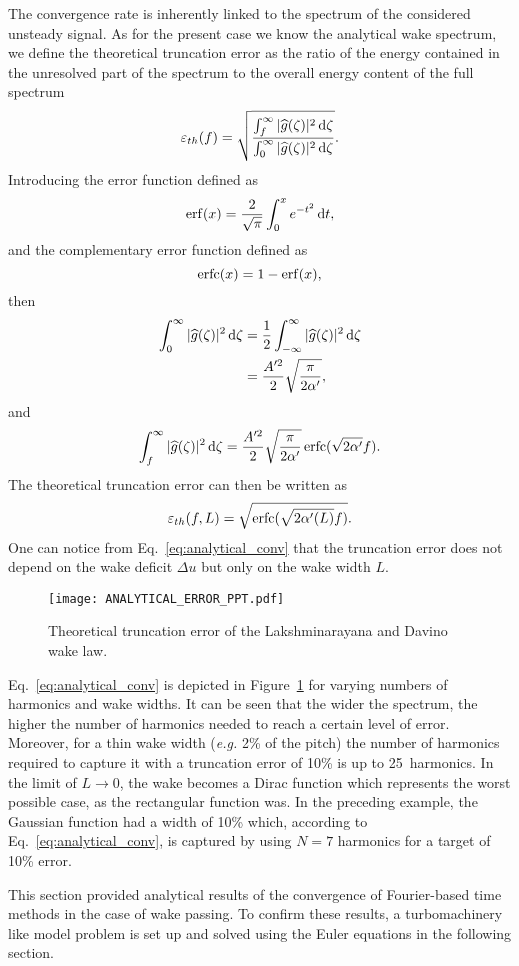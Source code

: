 The convergence rate is inherently linked to
the spectrum of the considered unsteady signal.
As for the present case we know the analytical wake spectrum,
we define the theoretical truncation error as the ratio of
the energy contained in the unresolved part 
of the spectrum to the overall energy content of the full spectrum
\begin{equation}
    \varepsilon_{th}(f) = \sqrt{\frac{
        \int_f^\infty | \widehat{g}(\zeta)|^2 \diff \zeta
      }{
        \int_0^\infty | \widehat{g}(\zeta)|^2 \diff \zeta
      }}.
    \label{eq:def_truncation_error}
\end{equation}
Introducing the error function defined as
\begin{equation}
    \operatorname{erf}(x) = \frac{2}{\sqrt{\pi}} \int_0^x e^{-t^2} \mathop{}\!\mathrm{d} t,
\end{equation}
and the complementary error function defined as
\begin{equation}
    \operatorname{erfc}(x) = 1 - \operatorname{erf}(x),
\end{equation}
then
\begin{align}
    \int_0^\infty | \widehat{g}(\zeta)|^2 \mathop{}\!\mathrm{d} \zeta 
    &= \frac{1}{2} \int_{- \infty}^\infty | \widehat{g}(\zeta)|^2 \mathop{}\!\mathrm{d} \zeta \\
    &= \frac{A^{\prime 2}}{2} \sqrt{\frac{\pi}{2 \alpha^\prime}},
\end{align}
and
\begin{equation}
    \int_f^\infty | \widehat{g}(\zeta)|^2 \mathop{}\!\mathrm{d} \zeta = 
      \frac{A^{\prime 2}}{2} \sqrt{\frac{\pi}{2 \alpha^\prime}} \operatorname{erfc} (\sqrt{2 \alpha^\prime} f).
\end{equation}
The theoretical truncation error can then be written as
\begin{equation}
    \varepsilon_{th}(f, L) = \sqrt{\erfc (\sqrt{2 \alpha^\prime(L) } f)}.
    \label{eq:analytical_conv}
\end{equation}
One can notice from Eq.~\eqref{eq:analytical_conv} that the 
truncation error does not depend on the wake deficit $\Delta u$ 
but only on the wake width $L$.

\begin{figure}[htp]
    \centering\texttt{[image: ANALYTICAL\_ERROR\_PPT.pdf]}
  \caption{Theoretical truncation error of the Lakshminarayana and Davino wake law.}
  \label{fig:analytic_error_paper}
\end{figure}
Eq.~\eqref{eq:analytical_conv} is depicted in
Figure~\ref{fig:analytic_error_paper} for varying
numbers of harmonics and wake widths.
It can be seen that the wider the spectrum,
the higher the number of harmonics needed to
reach a certain level of error. 
Moreover, for a thin wake width (\emph{e.g.} 2\% of the pitch)
the number of harmonics required to capture it with a truncation 
error of 10\% is up to 25~harmonics.
In the limit of $L \to 0$, the wake becomes a Dirac function
which represents the worst possible case, as the rectangular
function was.
In the preceding example, the Gaussian function had a width
of 10\% which, according to Eq.~\eqref{eq:analytical_conv},
is captured by using $N=7$ harmonics for a target of 10\% error.

This section provided analytical results of the
convergence of Fourier-based time methods 
in the case of wake passing. To confirm these results,
a turbomachinery like model problem
is set up and solved using the Euler equations in
the following section.



